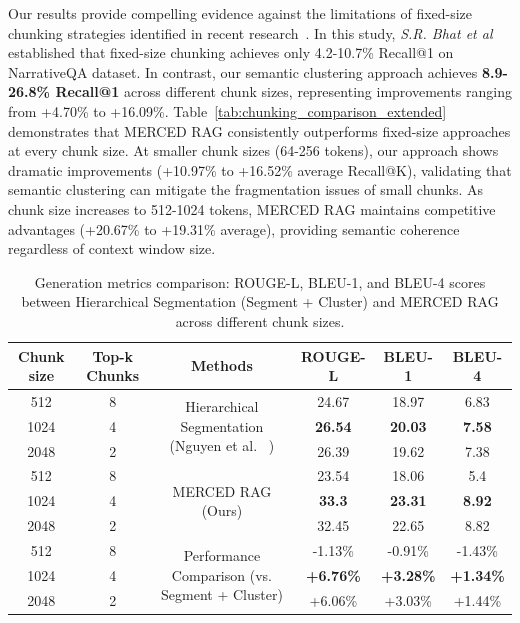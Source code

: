 \documentclass[10pt,twocolumn,letterpaper]{article}
\begin{document}
\vspace{0.5em}
Our results provide compelling evidence against the limitations of fixed-size chunking strategies identified in recent research~\cite{Bhat2025Rethinking}. In this study, \textit{S.R. Bhat et al}~\cite{Bhat2025Rethinking} established that fixed-size chunking achieves only 4.2-10.7\% Recall@1 on NarrativeQA dataset. In contrast, our semantic clustering approach achieves \textbf{8.9-26.8\% Recall@1} across different chunk sizes, representing improvements ranging from +4.70\% to +16.09\%. Table~\ref{tab:chunking_comparison_extended} demonstrates that MERCED RAG consistently outperforms fixed-size approaches at every chunk size. At smaller chunk sizes (64-256 tokens), our approach shows dramatic improvements (+10.97\% to +16.52\% average Recall@K), validating that semantic clustering can mitigate the fragmentation issues of small chunks. As chunk size increases to 512-1024 tokens, MERCED RAG maintains competitive advantages (+20.67\% to +19.31\% average), providing semantic coherence regardless of context window size.

\begin{table}[!ht]
\caption{Generation metrics comparison: ROUGE-L, BLEU-1, and BLEU-4 scores between Hierarchical Segmentation (Segment + Cluster) and MERCED RAG across different chunk sizes.}
\centering
\begin{tabular}{cccccc}
\toprule
\textbf{Chunk size} & \textbf{Top-k Chunks} & \textbf{Methods} & \textbf{ROUGE-L} & \textbf{BLEU-1} & \textbf{BLEU-4} \\
\midrule
512 & 8 & \multirow{3}{*}{Hierarchical Segmentation (Nguyen et al. ~\cite{nguyen2025enhancing})} & 24.67 & 18.97 & 6.83 \\
1024 & 4 & & \textbf{26.54} & \textbf{20.03} & \textbf{7.58} \\
2048 & 2 & & 26.39 & 19.62 & 7.38 \\
\midrule
512 & 8 & \multirow{3}{*}{MERCED RAG (Ours)} & 23.54 & 18.06 & 5.4 \\
1024 & 4 & & \textbf{33.3} & \textbf{23.31} & \textbf{8.92} \\
2048 & 2 & & 32.45 & 22.65 & 8.82 \\
\midrule
512 & 8 & \multirow{3}{*}{Performance Comparison (vs. Segment + Cluster)} & -1.13\% & -0.91\% & -1.43\% \\
1024 & 4 & & \textbf{+6.76\%} & \textbf{+3.28\%} & \textbf{+1.34\%} \\
2048 & 2 & & +6.06\% & +3.03\% & +1.44\% \\
\bottomrule
\end{tabular}
\label{tab:segment_cluster_comparison_corrected}
\end{table}
\end{document}
